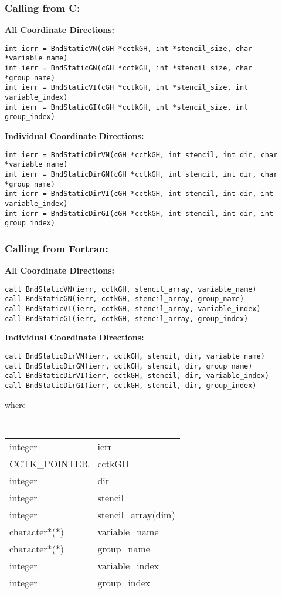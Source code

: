 \documentclass{article}
\begin{document}
\subsubsection*{Calling from C:}

{\bf All Coordinate Directions:}
\begin{verbatim}
int ierr = BndStaticVN(cGH *cctkGH, int *stencil_size, char *variable_name)
int ierr = BndStaticGN(cGH *cctkGH, int *stencil_size, char *group_name)
int ierr = BndStaticVI(cGH *cctkGH, int *stencil_size, int variable_index)
int ierr = BndStaticGI(cGH *cctkGH, int *stencil_size, int group_index)
\end{verbatim}

\noindent
{\bf Individual Coordinate Directions:}
\begin{verbatim}
int ierr = BndStaticDirVN(cGH *cctkGH, int stencil, int dir, char *variable_name)
int ierr = BndStaticDirGN(cGH *cctkGH, int stencil, int dir, char *group_name)
int ierr = BndStaticDirVI(cGH *cctkGH, int stencil, int dir, int variable_index)
int ierr = BndStaticDirGI(cGH *cctkGH, int stencil, int dir, int group_index)
\end{verbatim}

\subsubsection*{Calling from Fortran:}

{\bf All Coordinate Directions:}
\begin{verbatim}
call BndStaticVN(ierr, cctkGH, stencil_array, variable_name)
call BndStaticGN(ierr, cctkGH, stencil_array, group_name)
call BndStaticVI(ierr, cctkGH, stencil_array, variable_index)
call BndStaticGI(ierr, cctkGH, stencil_array, group_index)
\end{verbatim}

\noindent
{\bf Individual Coordinate Directions:}
\begin{verbatim}
call BndStaticDirVN(ierr, cctkGH, stencil, dir, variable_name)
call BndStaticDirGN(ierr, cctkGH, stencil, dir, group_name)
call BndStaticDirVI(ierr, cctkGH, stencil, dir, variable_index)
call BndStaticDirGI(ierr, cctkGH, stencil, dir, group_index)
\end{verbatim}
where

{\tt
\begin{tabular}{ll}
integer & ierr \\
CCTK\_POINTER & cctkGH\\
integer & dir\\
integer & stencil\\
integer & stencil\_array(dim)\\
character*(*) & variable\_name\\
character*(*) & group\_name\\
integer & variable\_index\\
integer & group\_index\\
\end{tabular}
}
\end{document}
